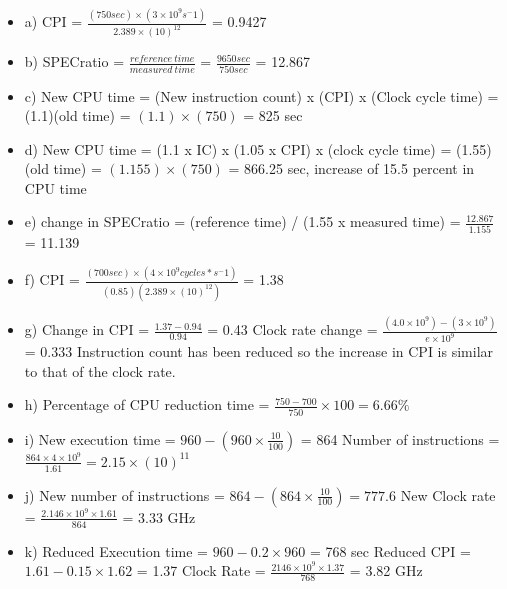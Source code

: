 \documentclass{article}
\begin{document}
\begin{itemize}
    \item a) CPI = $\frac{(750 sec) \times (3 \times 10^9 s^-1)}{2.389 \times (10)^{12}}$ = 0.9427
    \item b) SPECratio = $\frac{reference\ time}{measured\ time}$ = $\frac{9650 sec}{750 sec}$ = 12.867
    \item c) New CPU time = (New instruction count) x (CPI) x (Clock cycle time) = (1.1)(old time) = $(1.1) \times (750)$ = 825 sec
    \item d) New CPU time = (1.1 x IC) x (1.05 x CPI) x (clock cycle time) = (1.55)(old time) = $(1.155) \times (750)$ = 866.25 sec, increase of 15.5 percent in CPU time
    \item e) change in SPECratio = (reference time) / (1.55 x measured time) = $\frac{12.867}{1.155}$ = 11.139
    \item f) CPI = $\frac{(700 sec) \times (4 \times 10^9 cycles*s^-1)}{(0.85)(2.389 \times (10)^{12})}$ = 1.38
    \item g) Change in CPI = $\frac{1.37 - 0.94}{0.94}$ = 0.43\newline
    Clock rate change = $\frac{(4.0 \times 10^9) - (3 \times 10^9)}{e \times 10^9}$ = 0.333\newline
    Instruction count has been reduced so the increase in CPI is similar to that of the clock rate.
    \item h) Percentage of CPU reduction time = $\frac{750 - 700}{750} \times 100 = 6.66\%$
    \item i) New execution time = $960 - (960 \times \frac{10}{100})$ = 864\newline
    Number of instructions = $\frac{864 \times 4 \times 10^9}{1.61} = 2.15 \times (10)^{11}$
    \item j) New number of instructions = $864 - (864 \times \frac{10}{100}) = 777.6$\newline
    New Clock rate = $\frac{2.146 \times 10^9 \times 1.61}{864}$ = 3.33 GHz
    \item k) Reduced Execution time = $960 - 0.2 \times 960$ = 768 sec\newline
    Reduced CPI = $1.61 - 0.15 \times 1.62$ = 1.37\newline
    Clock Rate = $\frac{2146 \times 10^9 \times 1.37}{768}$ = 3.82 GHz
\end{itemize}
\end{document}
